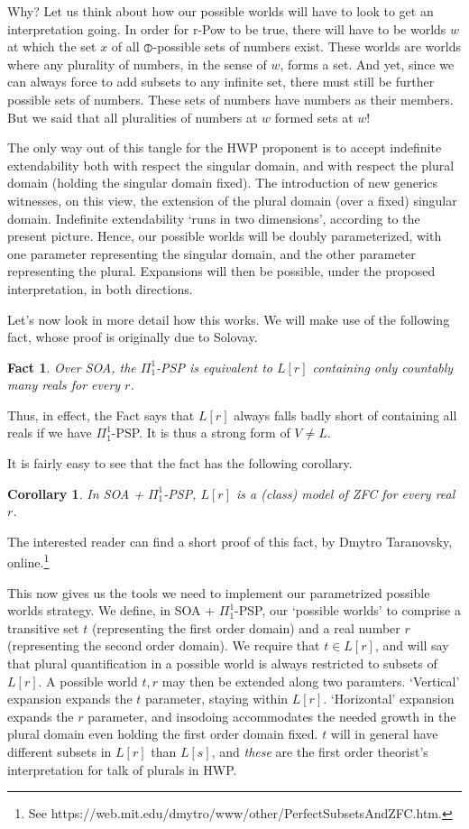 \documentclass{article}
\newtheorem{fact}[theorem]{Fact}
\newtheorem{corollary}[theorem]{Corollary}
\begin{document}
Why?
Let us think about how our possible worlds will have 
to look to get an interpretation going. In order for r-Pow to be true, 
there will have to be worlds $w$ at which the set $x$ 
of all $\circledbar$-possible sets of numbers 
exist. These worlds are worlds where 
any plurality of numbers, in the sense of $w$, forms a set. 
And yet, since we can always force to add subsets to any infinite set, 
there must still be further possible sets of numbers. These sets of numbers 
have numbers as their members. But we said that all pluralities of numbers at 
$w$ formed sets at $w$!

The only way out of this tangle for the HWP proponent is to accept indefinite 
extendability both with respect the singular domain, and with respect the plural 
domain (holding the singular domain fixed). The introduction of new generics 
witnesses, on this view, the extension of the plural domain (over a fixed) singular 
domain. Indefinite extendability `runs in two dimensions', according to the present 
picture. Hence, our possible worlds will be doubly parameterized, with one 
parameter representing the singular domain, and the other parameter representing the
plural. Expansions will then be possible, under the proposed interpretation, in 
both directions. 

Let's now look in more detail 
how this works. We will make use of the following fact, whose proof 
is originally due to Solovay.
\begin{fact}\label{sol}
    Over SOA, the $\Pi_1^1$-PSP is equivalent to $L[r]$ containing only 
    countably many reals for every $r$.
\end{fact}
Thus, in effect, the Fact says that $L[r]$ always falls badly short of containing 
all reals if we have $\Pi_1^1$-PSP. It is thus a strong form of $V \not = L$.

It is fairly easy to see that the fact has the following corollary.
\begin{corollary}
    In  SOA + $\Pi_1^1$-PSP, $L[r]$ is a (class) model of ZFC for every real $r$.
\end{corollary}
The interested reader can find a short proof of this fact, by Dmytro Taranovsky, online.\footnote{
    See https://web.mit.edu/dmytro/www/other/PerfectSubsetsAndZFC.htm.
}

This now gives us the tools we need to implement our parametrized possible worlds 
strategy. We define, in SOA + $\Pi_1^1$-PSP, our `possible worlds' to comprise
a transitive set $t$ (representing the first order domain) and a real number $r$
(representing the second order domain). We require that $t \in L[r]$, 
and will say that plural quantification in a possible world is always 
restricted to subsets of $L[r]$. A possible world $t, r$ may then be extended 
along two paramters. `Vertical' expansion expands the $t$ parameter, staying within 
$L[r]$. `Horizontal' expansion expands the $r$ parameter, and insodoing 
accommodates the needed growth in the plural domain even holding the first 
order domain fixed. $t$ will in general have different subsets in $L[r]$ than 
$L[s]$, and \emph{these} are the first order theorist's interpretation for talk of 
plurals in HWP. 
\end{document}
